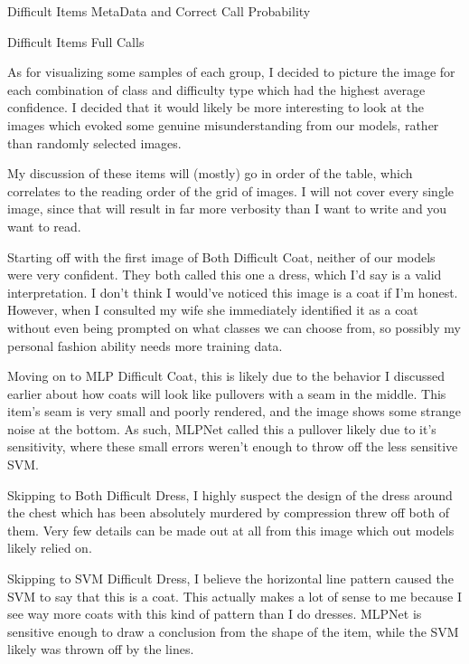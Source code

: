 \documentclass[12pt]{article}
\begin{document}
\begin{table}
    \resizebox*{.95\textwidth}{!}{}
    \caption{Difficult Items MetaData and Correct Call Probability}
    \label{table2}
\end{table}

\begin{table}
  \resizebox*{.95\textwidth}{!}{}
  \caption{Difficult Items Full Calls}
  \label{table3}
\end{table}
As for visualizing some samples of each group, I decided to picture the image for each combination of class and difficulty
type which had the highest average confidence. I decided that it would likely be more interesting to look at the images which
evoked some genuine misunderstanding from our models, rather than randomly selected images.

My discussion of these items will (mostly) go in order of the table, which correlates to the reading order of the grid of images.
I will not cover every single image, since that will result in far more verbosity than I want to write and you want to read.

Starting off with the first image of Both Difficult Coat, neither of our models were very confident. They both called this one a dress, which I'd
say is a valid interpretation. I don't think I would've noticed this image is a coat if I'm honest. However, when I consulted 
my wife she immediately identified it as a coat without even being prompted on what classes we can choose from, so possibly 
my personal fashion ability needs more training data.

Moving on to MLP Difficult Coat, this is likely due to the behavior I discussed earlier about how coats will look like pullovers
with a seam in the middle. This item's seam is very small and poorly rendered, and the image shows some strange noise at the bottom.
As such, MLPNet called this a pullover likely due to it's sensitivity, where these small errors weren't enough to throw off the 
less sensitive SVM.

Skipping to Both Difficult Dress, I highly suspect the design of the dress around the chest which has been absolutely murdered
by compression threw off both of them. Very few details can be made out at all from this image which out models likely relied on.

Skipping to SVM Difficult Dress, I believe the horizontal line pattern caused the SVM to say that this is a coat. This actually 
makes a lot of sense to me because I see way more coats with this kind of pattern than I do dresses. MLPNet is sensitive enough 
to draw a conclusion from the shape of the item, while the SVM likely was thrown off by the lines.
\end{document}
